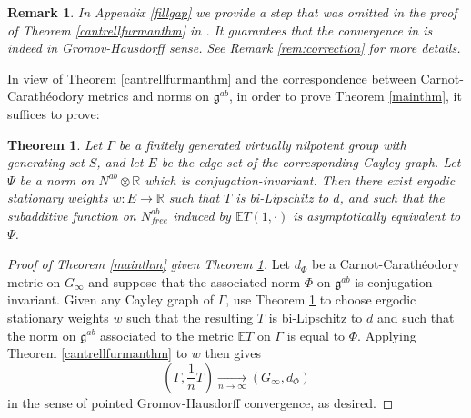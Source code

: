 \documentclass[12pt,reqno]{article}
\makeatletter
\let\reftagform@=\tagform@
\def\tagform@#1{\maketag@@@{(\ignorespaces\textcolor{purple}{#1}\unskip\@@italiccorr)}}
\renewcommand{\eqref}[1]{\textup{\reftagform@{\ref{#1}}}}
\numberwithin{equation}{section}
\newcommand{\R}{\mathbb{R}}
\newcommand{\E}{\mathbb{E}}
\newcommand{\tendsto}[2]{\xrightarrow[#1 \to #2]{}}
\newcommand{\g}{\mathfrak{g}}
\newtheorem{thm}{Theorem}
\newtheorem{rmk}{Remark}
\makeatother
\begin{document}
 
 
 \begin{rmk}
In Appendix \ref{fillgap} we provide a step that was omitted in the proof of Theorem \ref{cantrellfurmanthm} in \cite{CantrellFurman}. It guarantees that the convergence in \eqref{ehww} is indeed in Gromov-Hausdorff sense. See Remark \ref{rem:correction} for more details.
 \end{rmk}
 
 In view of Theorem \ref{cantrellfurmanthm} and the correspondence between Carnot-Carath\'eodory metrics and norms on $\g^{ab}$, 
 in order to prove Theorem \ref{mainthm}, it suffices to prove:
 \begin{thm} \label{reducedthm}
 Let $\Gamma$ be a finitely generated virtually nilpotent group with generating set $S$, and let $E$ be the edge set of the
corresponding Cayley graph.
 Let $\Psi$ be a norm on $N^{ab} \otimes \R$ which is conjugation-invariant. Then there exist ergodic stationary weights $w:E \to \R$ such that
 $T$ is bi-Lipschitz to $d$, and such that the subadditive function on $N^{ab}_{free}$ induced by $\E T(1, \cdot)$
 is asymptotically equivalent to $\Psi$.
 \end{thm}
 
 
 
 
 
 

\begin{proof}[Proof of Theorem \ref{mainthm} given Theorem \ref{reducedthm}]
Let $d_{\Phi}$ be a Carnot-Carath\'eodory metric on $G_{\infty}$ and suppose that the associated norm $\Phi$ on $\g^{ab}$
is conjugation-invariant. Given any Cayley graph of $\Gamma$, use Theorem \ref{reducedthm} to choose ergodic stationary weights $w$ 
such that the resulting $T$ is bi-Lipschitz to $d$ and such that the norm on $\g^{ab}$ associated to the metric $\E T$ on $\Gamma$
is equal to $\Phi$.
Applying Theorem \ref{cantrellfurmanthm} to $w$ then gives
\[
   \left(\Gamma, \frac{1}{n} T\right) \tendsto{n}{\infty} (G_{\infty}, d_{\Phi})
\]
in the sense of pointed Gromov-Hausdorff convergence, as desired.
\end{proof}
\end{document}
